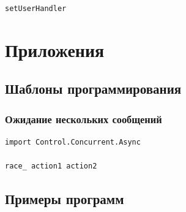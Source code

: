 \documentclass[9pt,a4paper]{article}
\begin{document}
\lstinline!setUserHandler!

\section{Приложения}
\subsection{Шаблоны программирования}
\subsubsection{Ожидание нескольких сообщений}

\begin{lstlisting}
import Control.Concurrent.Async

race_ action1 action2
\end{lstlisting}

\subsection{Примеры программ}

\end{document}
